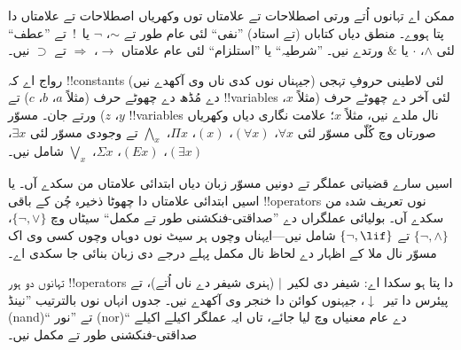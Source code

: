 \documentclass[../../../include/open-logic-section]{subfiles}
\begin{document}

\begin{intro}
ممکن اے تہانوں اُتے ورتی اصطلاحات تے علامتاں توں
وکھریاں اصطلاحات تے علامتاں دا پتا ہووے۔ منطق دیاں کتاباں
(تے استاد) ”نفی“ لئی عام طور تے $\sim$، $\neg$ یا~!\
تے ”عطف“ لئی $\wedge$، $\cdot$ یا $\&$ ورتدے نیں۔
”شرطیہ“ یا ”استلزام“ لئی عام علامتاں $\rightarrow$،
$\Rightarrow$ تے $\supset$ نیں۔

رواج اے کہ !!{constant}s (جیہناں نوں کدی ناں وی آکھدے نیں)
لئی لاطینی حروفِ تہجی دے مُڈھ دے چھوٹے حرف (مثلاً $a$، $b$، $c$)
تے !!{variable}s لئی آخر دے چھوٹے حرف (مثلاً $x$، $y$، $z$)
ورتے جان۔ مسوّر !!{variable}s نال ملدے نیں، مثلاً $x$؛
علامت نگاری دیاں وکھریاں صورتاں وچ کُلّی مسوّر لئی
$\forall x$، $(\forall x)$، $(x)$، $\Pi x$، $\bigwedge_x$
تے وجودی مسوّر لئی $\exists x$، $(\exists
x)$، $(Ex)$، $\Sigma x$، $\bigvee_x$ شامل نیں۔
\end{intro}

\begin{explain}
اسیں سارے قضیاتی عملگر تے دونیں مسوّر زبان دیاں ابتدائی
علامتاں من سکدے آں۔ یا اسیں ابتدائی علامتاں دا چھوٹا
ذخیرہ چُن کے باقی !!{operator}s نوں تعریف شدہ من سکدے آں۔
بولیائی عملگراں دے ”صداقتی-فنکشنی طور تے مکمل“ سیٹاں وچ
$\{ \lnot, \lor \}$، $\{ \lnot, \land \}$ تے $\{ \lnot,
\lif\}$ شامل نیں—ایہناں وچوں ہر سیٹ نوں دوہاں وچوں کسی وی
اک مسوّر نال ملا کے اظہار دے لحاظ نال مکمل پہلے درجے دی
زبان بنائی جا سکدی اے۔

تہانوں دو ہور !!{operator}s دا پتا ہو سکدا اے: شیفر دی لکیر~$|$
(ہنری شیفر دے ناں اُتے)، تے پیئرس دا تیر~$\downarrow$،
جیہنوں کوائن دا خنجر وی آکھدے نیں۔ جدوں انہاں نوں بالترتیب
”نینڈ (nand)“ تے ”نور (nor)“ دے عام معنیاں وچ لیا جائے،
تاں ایہ عملگر اکیلے اکیلے صداقتی-فنکشنی طور تے مکمل نیں۔
\end{explain}
\end{document}
